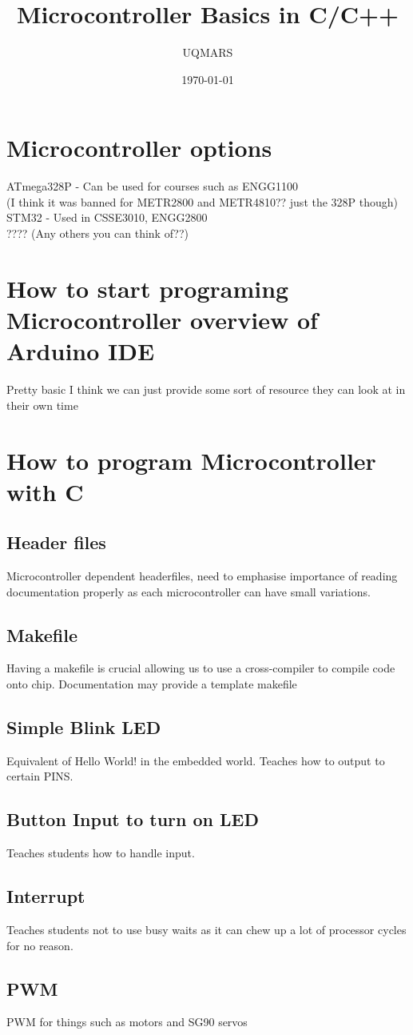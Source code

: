 \documentclass[11pt]{article}
\title{Microcontroller Basics in C/C++}
\author{UQMARS}
\date{\today}
\begin{document}
\maketitle
\pagebreak
\section*{Microcontroller options}
ATmega328P - Can be used for courses such as ENGG1100\\ (I think it was banned for METR2800 and METR4810?? just the 328P though)
STM32 - Used in CSSE3010, ENGG2800\\
???? (Any others you can think of??)
\section*{How to start programing Microcontroller overview of Arduino IDE}
Pretty basic I think we can just provide some sort of resource they can look at in their own time
\section*{How to program Microcontroller with C}
\subsection*{Header files}
Microcontroller dependent headerfiles, need to emphasise importance of reading documentation properly
as each microcontroller can have small variations.
\subsection*{Makefile}
Having a makefile is crucial allowing us to use a cross-compiler to compile code onto chip.
Documentation may provide a template makefile
\subsection*{Simple Blink LED}
Equivalent of Hello World! in the embedded world. Teaches how to output to certain PINS.
\subsection*{Button Input to turn on LED}
Teaches students how to handle input.
\subsection*{Interrupt}
Teaches students not to use busy waits as it can chew up a lot of processor cycles for no reason.
\subsection*{PWM}
PWM for things such as motors and SG90 servos
\end{document}
